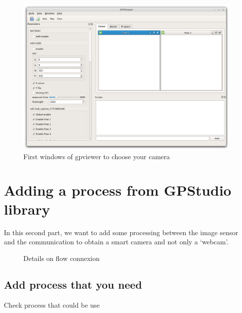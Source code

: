 \documentclass[10pt,a4paper]{article}
\begin{document}
\begin{figure}[h!]
\centering
\includegraphics[scale=0.35]{gpviewer_mainwindows.jpg}
\caption{First windows of gpviewer to choose your camera}
\end{figure}

\newpage
\section{Adding a process from GPStudio library}
In this second part, we want to add some processing between the image sensor and the communication to obtain a smart camera and not only a `webcam'.

\begin{figure}[h!]
\centering
{}
\caption{Details on flow connexion}
\end{figure}

\subsection{Add process that you need}
Check process that could be use
\end{document}
